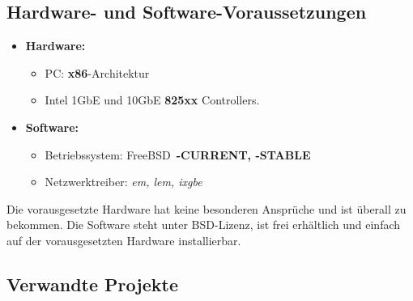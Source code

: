 \subsection{Hardware- und Software-Voraussetzungen} \label{sec:hwsw_voraus}
\begin{itemize}
 	\item \textbf{Hardware:}
		\begin{itemize}
			\item PC: \textbf{x86}-Architektur
 			\item Intel 1GbE und 10GbE \textbf{825xx} Controllers.
		\end{itemize}
	\item \textbf{Software:}
		\begin{itemize}
			\item Betriebssystem: FreeBSD~\textbf{-CURRENT, -STABLE}
			\item Netzwerktreiber: \emph{em, lem, ixgbe}
		\end{itemize}
\end{itemize}
Die vorausgesetzte Hardware hat keine besonderen Ansprüche und ist überall zu
bekommen.  Die Software steht unter BSD-Lizenz, ist frei erhältlich und einfach
auf der vorausgesetzten Hardware installierbar. 
\subsection{Verwandte Projekte}
